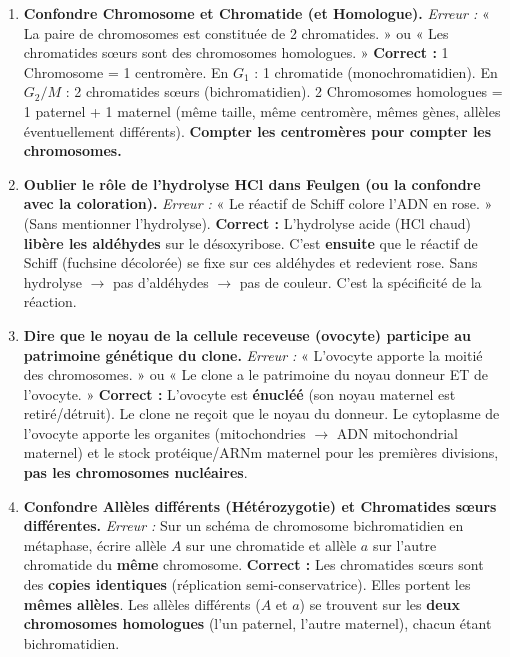 \documentclass[11pt]{article}
\begin{document}
\begin{attention}
\begin{enumerate}
    \item \textbf{Confondre Chromosome et Chromatide (et Homologue).}
    \textit{Erreur :} « La paire de chromosomes est constituée de 2 chromatides. » ou « Les chromatides sœurs sont des chromosomes homologues. »
    \textbf{Correct :} 1 Chromosome = 1 centromère. En $G_1$ : 1 chromatide (monochromatidien). En $G_2/M$ : 2 chromatides sœurs (bichromatidien). 2 Chromosomes homologues = 1 paternel + 1 maternel (même taille, même centromère, mêmes gènes, allèles éventuellement différents). \textbf{Compter les centromères pour compter les chromosomes.}
    
    \item \textbf{Oublier le rôle de l'hydrolyse HCl dans Feulgen (ou la confondre avec la coloration).}
    \textit{Erreur :} « Le réactif de Schiff colore l'ADN en rose. » (Sans mentionner l'hydrolyse).
    \textbf{Correct :} L'hydrolyse acide (HCl chaud) \textbf{libère les aldéhydes} sur le désoxyribose. C'est \textbf{ensuite} que le réactif de Schiff (fuchsine décolorée) se fixe sur ces aldéhydes et redevient rose. Sans hydrolyse $\rightarrow$ pas d'aldéhydes $\rightarrow$ pas de couleur. C'est la spécificité de la réaction.
    
    \item \textbf{Dire que le noyau de la cellule receveuse (ovocyte) participe au patrimoine génétique du clone.}
    \textit{Erreur :} « L'ovocyte apporte la moitié des chromosomes. » ou « Le clone a le patrimoine du noyau donneur ET de l'ovocyte. »
    \textbf{Correct :} L'ovocyte est \textbf{énucléé} (son noyau maternel est retiré/détruit). Le clone ne reçoit que le noyau du donneur. Le cytoplasme de l'ovocyte apporte les organites (mitochondries $\rightarrow$ ADN mitochondrial maternel) et le stock protéique/ARNm maternel pour les premières divisions, \textbf{pas les chromosomes nucléaires}.
    
    \item \textbf{Confondre Allèles différents (Hétérozygotie) et Chromatides sœurs différentes.}
    \textit{Erreur :} Sur un schéma de chromosome bichromatidien en métaphase, écrire allèle $A$ sur une chromatide et allèle $a$ sur l'autre chromatide du \textbf{même} chromosome.
    \textbf{Correct :} Les chromatides sœurs sont des \textbf{copies identiques} (réplication semi-conservatrice). Elles portent les \textbf{mêmes allèles}. Les allèles différents ($A$ et $a$) se trouvent sur les \textbf{deux chromosomes homologues} (l'un paternel, l'autre maternel), chacun étant bichromatidien.
    

\end{enumerate}
\end{attention}
\end{document}
